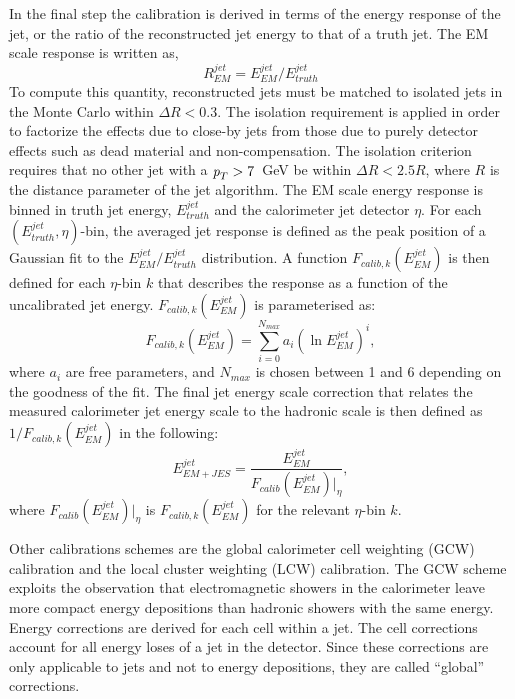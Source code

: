 In the final step the calibration is derived in terms of the energy response of the jet, or the ratio of the reconstructed jet energy to that of a truth jet.  The EM scale response is written as,
%
\begin{equation}
R^{jet}_{EM} = E^{jet}_{EM} / E^{jet}_{truth}
\end{equation}
%
To compute this quantity, reconstructed jets must be matched to isolated jets in the Monte Carlo within $\Delta R < 0.3$. The isolation requirement is applied in order to factorize the effects due to close-by jets from those due to purely detector effects such as dead material and non-compensation. The isolation criterion requires that no other jet with a ${\emph{p}_{T}} > 7$~GeV be within $\Delta R < 2.5R$, where $R$ is the distance parameter of the jet algorithm. The EM scale energy response is binned in truth jet energy, $E^{jet}_{truth}$ and the calorimeter jet detector $\eta$.  For each $(E^{jet}_{truth}, \eta)$-bin, the averaged jet response is defined as the peak position of a Gaussian fit to the $E^{jet}_{EM} / E^{jet}_{truth}$ distribution.  A function $F_{calib,k}(E^{jet}_{EM})$ is then defined for each $\eta$-bin $k$ that describes the response as a function of the uncalibrated jet energy. $F_{calib,k}(E^{jet}_{EM})$ is parameterised as:
%
\begin{equation}
F_{calib,k}(E^{jet}_{EM}) = \sum_{i=0}^{N_{max}} a_i (\ln E^{jet}_{EM})^i,
\end{equation}
%
where $a_i$ are free parameters, and $N_{max}$ is chosen between 1 and 6 depending on the goodness of the fit. The final jet energy scale correction that relates the measured calorimeter jet energy scale to the hadronic scale is then defined as $1/F_{calib,k}(E^{jet}_{EM})$ in the following:
%
\begin{equation}
E^{jet}_{EM+JES} = \frac{E^{jet}_{EM}}{F_{calib}(E^{jet}_{EM})|_{\eta}},
\end{equation}
%
where $F_{calib}(E^{jet}_{EM})|_{\eta}$  is $F_{calib,k}(E^{jet}_{EM})$ for the relevant $\eta$-bin $k$.


Other calibrations schemes are the global calorimeter cell weighting (GCW) calibration and the local cluster weighting (LCW) calibration.  The GCW scheme exploits the observation that electromagnetic showers in the calorimeter leave more compact energy depositions than hadronic showers with the same energy.  Energy corrections are derived for each cell within a jet.  The cell corrections account for all energy loses of a jet in the detector. Since these corrections are only applicable to jets and not to energy depositions, they are called ``global'' corrections.

